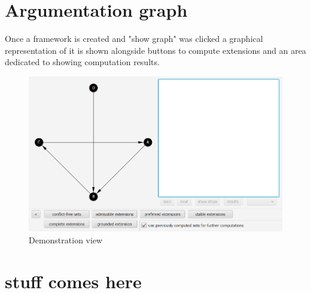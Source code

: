 \documentclass[draft,final]{vutinfth} %
\begin{document}
\section{Argumentation graph}
Once a framework is created and "show graph" was clicked a graphical representation of it is shown alongside buttons to compute extensions and an area dedicated to showing computation results.

\FloatBarrier
	\centering
	\begin{figure}[!htb]
		\includegraphics[width=\linewidth]{pics/demo.png}
		\caption{Demonstration view}
	\end{figure}
\FloatBarrier

\section{stuff comes here}

\backmatter




\printindex

\printglossaries
\end{document}
